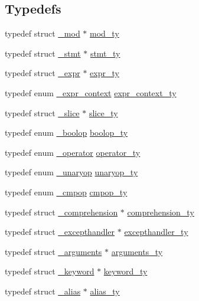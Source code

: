 \subsection*{Typedefs}
\begin{DoxyCompactItemize}
\item 
typedef struct \mbox{\hyperlink{struct__mod}{\+\_\+mod}} $\ast$ \mbox{\hyperlink{_python-ast_8h_ac5ca223bf2573144610f74dc91fc431e}{mod\+\_\+ty}}
\item 
typedef struct \mbox{\hyperlink{struct__stmt}{\+\_\+stmt}} $\ast$ \mbox{\hyperlink{_python-ast_8h_a39618071027b661bc03e8916e664e1a7}{stmt\+\_\+ty}}
\item 
typedef struct \mbox{\hyperlink{struct__expr}{\+\_\+expr}} $\ast$ \mbox{\hyperlink{_python-ast_8h_a56d3705e020a071405094a220c4592bd}{expr\+\_\+ty}}
\item 
typedef enum \mbox{\hyperlink{_python-ast_8h_a7cc9da6a6307ea8052f27a18bd3d7d5b}{\+\_\+expr\+\_\+context}} \mbox{\hyperlink{_python-ast_8h_a38710ce394ed6d5cc8ebe79a322dcdf9}{expr\+\_\+context\+\_\+ty}}
\item 
typedef struct \mbox{\hyperlink{struct__slice}{\+\_\+slice}} $\ast$ \mbox{\hyperlink{_python-ast_8h_a1aba5288236679e8faff34c189476bf0}{slice\+\_\+ty}}
\item 
typedef enum \mbox{\hyperlink{_python-ast_8h_a16067ed2b6546040536da29338709abf}{\+\_\+boolop}} \mbox{\hyperlink{_python-ast_8h_ab7ba8d66d81017932471af1f2609a830}{boolop\+\_\+ty}}
\item 
typedef enum \mbox{\hyperlink{_python-ast_8h_ab9d92a0f505af42d2049e62ae49ef932}{\+\_\+operator}} \mbox{\hyperlink{_python-ast_8h_a64ffe6085a53816a513038b9f1a04a9d}{operator\+\_\+ty}}
\item 
typedef enum \mbox{\hyperlink{_python-ast_8h_a2fcb7a4a9d1e6c4815772f808b402048}{\+\_\+unaryop}} \mbox{\hyperlink{_python-ast_8h_a5a89f44a24bfbdb92d5a16b59468cffb}{unaryop\+\_\+ty}}
\item 
typedef enum \mbox{\hyperlink{_python-ast_8h_aeae2807c86997ffad2fa6d972a29ee1f}{\+\_\+cmpop}} \mbox{\hyperlink{_python-ast_8h_aabeaddc9c86d689d06ce80e7ebb22789}{cmpop\+\_\+ty}}
\item 
typedef struct \mbox{\hyperlink{struct__comprehension}{\+\_\+comprehension}} $\ast$ \mbox{\hyperlink{_python-ast_8h_a465095ed82e25892d2ed2515ddfce38d}{comprehension\+\_\+ty}}
\item 
typedef struct \mbox{\hyperlink{struct__excepthandler}{\+\_\+excepthandler}} $\ast$ \mbox{\hyperlink{_python-ast_8h_af85359ef2251f8c9819960684e134dfb}{excepthandler\+\_\+ty}}
\item 
typedef struct \mbox{\hyperlink{struct__arguments}{\+\_\+arguments}} $\ast$ \mbox{\hyperlink{_python-ast_8h_a45cc6e94d598fdc335d8c85739108a3e}{arguments\+\_\+ty}}
\item 
typedef struct \mbox{\hyperlink{struct__keyword}{\+\_\+keyword}} $\ast$ \mbox{\hyperlink{_python-ast_8h_a7acec0a136fb87c323f0a2e320b933d0}{keyword\+\_\+ty}}
\item 
typedef struct \mbox{\hyperlink{struct__alias}{\+\_\+alias}} $\ast$ \mbox{\hyperlink{_python-ast_8h_a01f738700190ffcf2da799b99e05cbd1}{alias\+\_\+ty}}
\end{DoxyCompactItemize}
